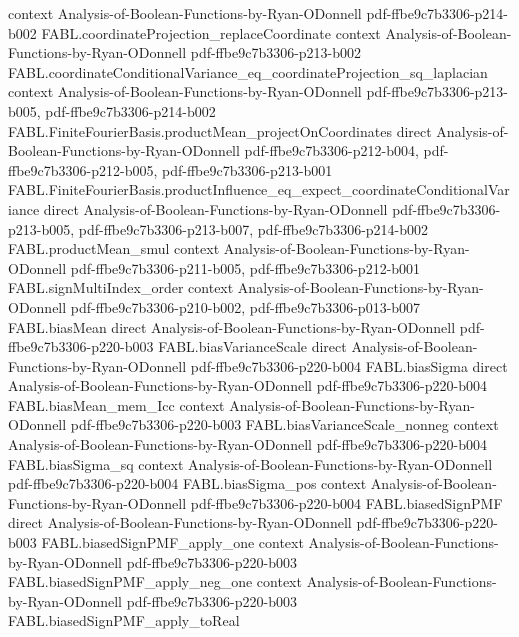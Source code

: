 \begin{theorem}
  {context}
  {Analysis-of-Boolean-Functions-by-Ryan-ODonnell}
  {pdf-ffbe9c7b3306-p214-b002}
\proofstep
  {FABL.coordinateProjection_replaceCoordinate}
  {context}
  {Analysis-of-Boolean-Functions-by-Ryan-ODonnell}
  {pdf-ffbe9c7b3306-p213-b002}
\proofstep
  {FABL.coordinateConditionalVariance_eq_coordinateProjection_sq_laplacian}
  {context}
  {Analysis-of-Boolean-Functions-by-Ryan-ODonnell}
  {pdf-ffbe9c7b3306-p213-b005,
    pdf-ffbe9c7b3306-p214-b002}
\proofstep
  {FABL.FiniteFourierBasis.productMean_projectOnCoordinates}
  {direct}
  {Analysis-of-Boolean-Functions-by-Ryan-ODonnell}
  {pdf-ffbe9c7b3306-p212-b004,
    pdf-ffbe9c7b3306-p212-b005,
    pdf-ffbe9c7b3306-p213-b001}
\proofstep
  {FABL.FiniteFourierBasis.productInfluence_eq_expect_coordinateConditionalVariance}
  {direct}
  {Analysis-of-Boolean-Functions-by-Ryan-ODonnell}
  {pdf-ffbe9c7b3306-p213-b005,
    pdf-ffbe9c7b3306-p213-b007,
    pdf-ffbe9c7b3306-p214-b002}
\proofstep
  {FABL.productMean_smul}
  {context}
  {Analysis-of-Boolean-Functions-by-Ryan-ODonnell}
  {pdf-ffbe9c7b3306-p211-b005,
    pdf-ffbe9c7b3306-p212-b001}
\proofstep
  {FABL.signMultiIndex_order}
  {context}
  {Analysis-of-Boolean-Functions-by-Ryan-ODonnell}
  {pdf-ffbe9c7b3306-p210-b002,
    pdf-ffbe9c7b3306-p013-b007}
\proofstep
  {FABL.biasMean}
  {direct}
  {Analysis-of-Boolean-Functions-by-Ryan-ODonnell}
  {pdf-ffbe9c7b3306-p220-b003}
\proofstep
  {FABL.biasVarianceScale}
  {direct}
  {Analysis-of-Boolean-Functions-by-Ryan-ODonnell}
  {pdf-ffbe9c7b3306-p220-b004}
\proofstep
  {FABL.biasSigma}
  {direct}
  {Analysis-of-Boolean-Functions-by-Ryan-ODonnell}
  {pdf-ffbe9c7b3306-p220-b004}
\proofstep
  {FABL.biasMean_mem_Icc}
  {context}
  {Analysis-of-Boolean-Functions-by-Ryan-ODonnell}
  {pdf-ffbe9c7b3306-p220-b003}
\proofstep
  {FABL.biasVarianceScale_nonneg}
  {context}
  {Analysis-of-Boolean-Functions-by-Ryan-ODonnell}
  {pdf-ffbe9c7b3306-p220-b004}
\proofstep
  {FABL.biasSigma_sq}
  {context}
  {Analysis-of-Boolean-Functions-by-Ryan-ODonnell}
  {pdf-ffbe9c7b3306-p220-b004}
\proofstep
  {FABL.biasSigma_pos}
  {context}
  {Analysis-of-Boolean-Functions-by-Ryan-ODonnell}
  {pdf-ffbe9c7b3306-p220-b004}
\proofstep
  {FABL.biasedSignPMF}
  {direct}
  {Analysis-of-Boolean-Functions-by-Ryan-ODonnell}
  {pdf-ffbe9c7b3306-p220-b003}
\proofstep
  {FABL.biasedSignPMF_apply_one}
  {context}
  {Analysis-of-Boolean-Functions-by-Ryan-ODonnell}
  {pdf-ffbe9c7b3306-p220-b003}
\proofstep
  {FABL.biasedSignPMF_apply_neg_one}
  {context}
  {Analysis-of-Boolean-Functions-by-Ryan-ODonnell}
  {pdf-ffbe9c7b3306-p220-b003}
\proofstep
  {FABL.biasedSignPMF_apply_toReal}

\end{theorem}
